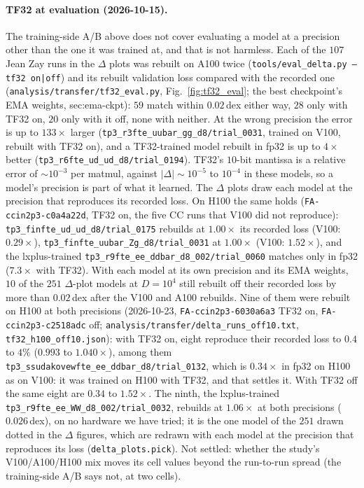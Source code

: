 \documentclass[11pt]{article}
\newcommand{\code}[1]{\texttt{#1}}
\begin{document}
\paragraph{TF32 at evaluation (2026-10-15).}\label{sec:tf32-eval} The training-side A/B above does not cover evaluating a
model at a precision other than the one it was trained at, and that is not harmless. Each of the $107$ Jean Zay runs in
the $\Delta$ plots was rebuilt on A100 twice (\code{tools/eval\_delta.py --tf32 on|off}) and its rebuilt validation loss
compared with the recorded one (\code{analysis/transfer/tf32\_eval.py}, Fig.~\ref{fig:tf32_eval}; the best
checkpoint's EMA weights, sec:ema-ckpt): $59$ match within $0.02$\,dex either way, $28$ only with TF32 on, $20$ only with
it off, none with neither. At the wrong precision the error
is up to $133\times$ larger (\code{tp3\_r3fte\_uubar\_gg\_d8/trial\_0031}, trained on V100, rebuilt with TF32 on), and a
TF32-trained model rebuilt in fp32 is up to $4\times$ better (\code{tp3\_r6fte\_ud\_ud\_d8/trial\_0194}). TF32's $10$-bit
mantissa is a relative error of $\sim10^{-3}$ per matmul, against $|\Delta|\sim10^{-5}$ to $10^{-4}$ in these models,
so a model's precision is part of what it learned. The $\Delta$ plots draw each model at the precision that reproduces
its recorded loss. On H100 the same holds (\code{FA-ccin2p3-c0a4a22d}, TF32 on, the five CC runs that V100 did not reproduce):
\code{tp3\_finfte\_ud\_ud\_d8/trial\_0175} rebuilds at $1.00\times$ its recorded loss (V100: $0.29\times$),
\code{tp3\_finfte\_uubar\_Zg\_d8/trial\_0031} at $1.00\times$ (V100: $1.52\times$), and the lxplus-trained
\code{tp3\_r9fte\_ee\_ddbar\_d8\_002/trial\_0060} matches only in fp32 ($7.3\times$ with TF32). With each model at its
own precision and its EMA weights, $10$ of the $251$ $\Delta$-plot models at $D=10^4$ still rebuilt off their recorded
loss by more than $0.02$\,dex after the V100 and A100 rebuilds. Nine of them were rebuilt on H100 at both precisions
(2026-10-23, \code{FA-ccin2p3-6030a6a3} TF32 on, \code{FA-ccin2p3-c2518adc} off; \code{analysis/transfer/delta\_runs\_off10.txt},
\code{tf32\_h100\_off10.json}): with TF32 on, eight reproduce their recorded loss to $0.4$ to $4\%$ ($0.993$ to
$1.040\times$), among them \code{tp3\_ssudakovewfte\_ee\_ddbar\_d8/trial\_0132}, which is $0.34\times$ in fp32 on H100 as on
V100: it was trained on H100 with TF32, and that settles it. With TF32 off the same eight are $0.34$ to $1.52\times$. The
ninth, the lxplus-trained \code{tp3\_r9fte\_ee\_WW\_d8\_002/trial\_0032}, rebuilds at $1.06\times$ at both precisions
($0.026$\,dex), on no hardware we have tried; it is the one model of the $251$ drawn dotted in the $\Delta$ figures,
which are redrawn with each model at the precision that reproduces its loss (\code{delta\_plots.pick}). Not settled: whether
the study's V100/A100/H100 mix moves its cell values beyond the run-to-run spread (the training-side A/B says not, at
two cells). 
\end{document}
